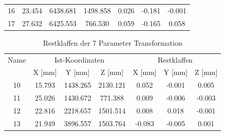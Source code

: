 \begin{table}[H]
\begin{tabular}{ccccccc}
\multicolumn{1}{p{2cm}|}{16} &
\multicolumn{1}{p{2cm}|}{23.454} &
\multicolumn{1}{p{2cm}|}{6438.681} &
\multicolumn{1}{p{2cm}|}{1498.858} &
\multicolumn{1}{p{2cm}|}{0.026} &
\multicolumn{1}{p{2cm}|}{-0.181} &
\multicolumn{1}{p{2cm}}{-0.001} \\

\multicolumn{1}{p{2cm}|}{17} &
\multicolumn{1}{p{2cm}|}{27.632} &
\multicolumn{1}{p{2cm}|}{6425.553} &
\multicolumn{1}{p{2cm}|}{766.530} &
\multicolumn{1}{p{2cm}|}{0.059} &
\multicolumn{1}{p{2cm}|}{-0.165} &
\multicolumn{1}{p{2cm}}{0.058} \\

\bottomrule
\end{tabular}
\end{table}

\begin{table}[H]\label{tab:restklaffen7p}
\centering
\caption{Restklaffen der 7 Parameter Transformation}

\begin{tabular}{ccccccc}
\toprule
\multicolumn{1}{p{1.5cm}|}{Name} &
\multicolumn{3}{c|}{Ist-Koordinaten} &
\multicolumn{3}{c}{Restklaffen} \\
\multicolumn{1}{p{2cm}|}{} &
\multicolumn{1}{p{2cm}|}{X [mm]} &
\multicolumn{1}{p{2cm}|}{Y [mm]} &
\multicolumn{1}{p{2cm}|}{Z [mm]} &
\multicolumn{1}{p{2cm}|}{X [mm]} &
\multicolumn{1}{p{2cm}|}{Y [mm]} &
\multicolumn{1}{p{2cm}}{Z [mm]} \\
\midrule

\multicolumn{1}{p{2cm}|}{10} &
\multicolumn{1}{p{2cm}|}{15.793} &
\multicolumn{1}{p{2cm}|}{1438.265} &
\multicolumn{1}{p{2cm}|}{2130.121} &
\multicolumn{1}{p{2cm}|}{0.052} &
\multicolumn{1}{p{2cm}|}{-0.001} &
\multicolumn{1}{p{2cm}}{0.005} \\

\multicolumn{1}{p{2cm}|}{11} &
\multicolumn{1}{p{2cm}|}{25.026} &
\multicolumn{1}{p{2cm}|}{1430.672} &
\multicolumn{1}{p{2cm}|}{771.388} &
\multicolumn{1}{p{2cm}|}{0.009} &
\multicolumn{1}{p{2cm}|}{-0.006} &
\multicolumn{1}{p{2cm}}{-0.003} \\

\multicolumn{1}{p{2cm}|}{12} &
\multicolumn{1}{p{2cm}|}{22.816} &
\multicolumn{1}{p{2cm}|}{2218.657} &
\multicolumn{1}{p{2cm}|}{1501.514} &
\multicolumn{1}{p{2cm}|}{0.008} &
\multicolumn{1}{p{2cm}|}{0.018} &
\multicolumn{1}{p{2cm}}{-0.001} \\

\multicolumn{1}{p{2cm}|}{13} &
\multicolumn{1}{p{2cm}|}{21.949} &
\multicolumn{1}{p{2cm}|}{3896.557} &
\multicolumn{1}{p{2cm}|}{1503.764} &
\multicolumn{1}{p{2cm}|}{-0.083} &
\multicolumn{1}{p{2cm}|}{-0.005} &
\multicolumn{1}{p{2cm}}{0.001} \\


\end{tabular}
\end{table}
